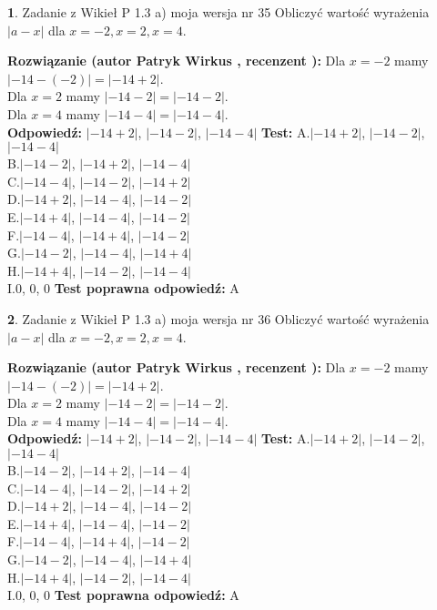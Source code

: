 \documentclass[12pt, a4paper]{article}
\theoremstyle{definition} %
\newtheorem{zad}{}
\newcommand{\zadStart}[1]{\begin{zad}#1\newline}
\newcommand{\zadStop}{\end{zad}}
\newcommand{\rozwStart}[2]{\noindent \textbf{Rozwiązanie (autor #1 , recenzent #2): }\newline}
\newcommand{\rozwStop}{\newline}
\newcommand{\odpStart}{\noindent \textbf{Odpowiedź:}\newline}
\newcommand{\odpStop}{\newline}
\newcommand{\testStart}{\noindent \textbf{Test:}\newline}
\newcommand{\testStop}{\newline}
\newcommand{\kluczStart}{\noindent \textbf{Test poprawna odpowiedź:}\newline}
\newcommand{\kluczStop}{\newline}
\begin{document}
\zadStart{Zadanie z Wikieł P 1.3 a) moja wersja nr 35}
Obliczyć wartość wyrażenia $|a - x|$ dla $x=-2,x=2,x=4$.
\zadStop
\rozwStart{Patryk Wirkus}{}
Dla $x = -2$ mamy $|-14 - (-2)| = |-14 + 2|$.\\
Dla $x = 2$ mamy $|-14 - 2| = |-14 - 2|$.\\
Dla $x = 4$ mamy $|-14 - 4| = |-14 - 4|$.\\
\rozwStop
\odpStart
$|-14 + 2|$, $|-14 - 2|$, $|-14 - 4|$
\odpStop
\testStart
A.$|-14 + 2|$, $|-14 - 2|$, $|-14 - 4|$\\
B.$|-14 - 2|$, $|-14 + 2|$, $|-14 - 4|$\\
C.$|-14 - 4|$, $|-14 - 2|$, $|-14 + 2|$\\
D.$|-14 + 2|$, $|-14 - 4|$, $|-14 - 2|$\\
E.$|-14 + 4|$, $|-14 - 4|$, $|-14 - 2|$\\
F.$|-14 - 4|$, $|-14 + 4|$, $|-14 - 2|$\\
G.$|-14 - 2|$, $|-14 - 4|$, $|-14 + 4|$\\
H.$|-14 + 4|$, $|-14 - 2|$, $|-14 - 4|$\\
I.$0$, $0$, $0$
\testStop
\kluczStart
A
\kluczStop



\zadStart{Zadanie z Wikieł P 1.3 a) moja wersja nr 36}
Obliczyć wartość wyrażenia $|a - x|$ dla $x=-2,x=2,x=4$.
\zadStop
\rozwStart{Patryk Wirkus}{}
Dla $x = -2$ mamy $|-14 - (-2)| = |-14 + 2|$.\\
Dla $x = 2$ mamy $|-14 - 2| = |-14 - 2|$.\\
Dla $x = 4$ mamy $|-14 - 4| = |-14 - 4|$.\\
\rozwStop
\odpStart
$|-14 + 2|$, $|-14 - 2|$, $|-14 - 4|$
\odpStop
\testStart
A.$|-14 + 2|$, $|-14 - 2|$, $|-14 - 4|$\\
B.$|-14 - 2|$, $|-14 + 2|$, $|-14 - 4|$\\
C.$|-14 - 4|$, $|-14 - 2|$, $|-14 + 2|$\\
D.$|-14 + 2|$, $|-14 - 4|$, $|-14 - 2|$\\
E.$|-14 + 4|$, $|-14 - 4|$, $|-14 - 2|$\\
F.$|-14 - 4|$, $|-14 + 4|$, $|-14 - 2|$\\
G.$|-14 - 2|$, $|-14 - 4|$, $|-14 + 4|$\\
H.$|-14 + 4|$, $|-14 - 2|$, $|-14 - 4|$\\
I.$0$, $0$, $0$
\testStop
\kluczStart
A
\kluczStop
\end{document}
